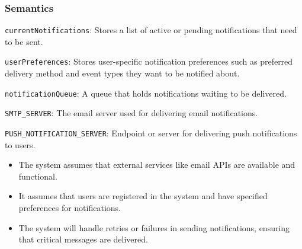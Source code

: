 \documentclass[12pt, titlepage]{article}
\begin{document}
\subsubsection{Semantics}
\begin{description}
  \item[State Variables:]
  \item \texttt{currentNotifications}: Stores a list of active or pending notifications that need 
  to be sent.
  \item \texttt{userPreferences}: Stores user-specific notification preferences such as preferred 
  delivery method and event types they want to be notified about.
  \item \texttt{notificationQueue}: A queue that holds notifications waiting to be delivered.
  \item
  \item[Environment Variables:] 
  \item \texttt{SMTP\_SERVER}: The email server used for delivering email notifications.
  \item \texttt{PUSH\_NOTIFICATION\_SERVER}: Endpoint or server for delivering push notifications
  to users.
  \item
  \item[Assumptions:] 
  \item
  \begin{itemize}
    \item The system assumes that external services like email APIs are available and functional.
  \end{itemize}
  \item 
  \begin{itemize}
    \item It assumes that users are registered in the system and have specified preferences for 
    notifications.
  \end{itemize}
  \item 
  \begin{itemize}
    \item The system will handle retries or failures in sending notifications, ensuring that critical 
    messages are delivered.
  \end{itemize}
  \item 


\end{description}
\end{document}

